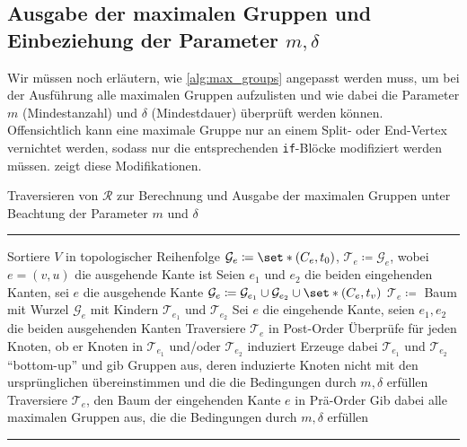 \subsection{Ausgabe der maximalen Gruppen und Einbeziehung der Parameter $m,\delta$} %
\label{sub:ausgabe_der_maximalen_gruppen_und_einbeziehung_der_parameter_m_delta}
Wir müssen noch erläutern, wie \cref{alg:max_groups} angepasst werden muss, um bei der Ausführung alle maximalen Gruppen aufzulisten und wie dabei die Parameter $m$ (Mindestanzahl) und $\delta$ (Mindestdauer) überprüft werden können.
Offensichtlich kann eine maximale Gruppe nur an einem Split- oder End-Vertex vernichtet werden, sodass nur die entsprechenden \texttt{if}-Blöcke modifiziert werden müssen.
 zeigt diese Modifikationen.
\begin{algorithm}[hbt]
	\caption{Traversieren von $\mathcal{R}$ zur Berechnung und Ausgabe der maximalen Gruppen unter Beachtung der Parameter $m$ und $\delta$} \label{alg:max_groups_final}
	\vspace{.5em}
	\hrule\vspace{.5em}
	
	\begin{algorithmic}
		\State Sortiere $V$ in topologischer Reihenfolge
			\State $\mathcal{G}_e \coloneqq \set*{(C_e,t_0)}$, $\mathcal{T}_e \coloneqq \mathcal{G}_e$, wobei $e=(v,u)$ die ausgehende Kante ist
			\State Seien $e_1$ und $e_2$ die beiden eingehenden Kanten, sei $e$ die ausgehende Kante
			\State $\mathcal{G}_e \coloneqq \mathcal{G}_{e_1} \cup \mathcal{G}_{e_2} \cup \set*{(C_e,t_v)}$
			\State $\mathcal{T}_e \coloneqq$ Baum mit Wurzel $\mathcal{G}_e$ mit Kindern $\mathcal{T}_{e_1}$ und $\mathcal{T}_{e_2}$
			\State Sei $e$ die eingehende Kante, seien $e_1,e_2$ die beiden ausgehenden Kanten
			\State Traversiere $\mathcal{T}_e$ in Post-Order
			\State Überprüfe für jeden Knoten, ob er Knoten in $\mathcal{T}_{e_1}$ und/oder $\mathcal{T}_{e_2}$ induziert
			\State Erzeuge dabei $\mathcal{T}_{e_1}$ und $\mathcal{T}_{e_2}$ \enquote{bottom-up} und gib Gruppen aus, deren induzierte Knoten
			\State nicht mit den ursprünglichen übereinstimmen und die die Bedingungen durch $m, \delta$ erfüllen
			\State Traversiere $\mathcal{T}_e$, den Baum der eingehenden Kante $e$ in Prä-Order
			\State Gib dabei alle maximalen Gruppen aus, die die Bedingungen durch $m,\delta$ erfüllen
			\EndIf
		\EndFor
		\EndProcedure
	\end{algorithmic}
	\hrule
\end{algorithm}

